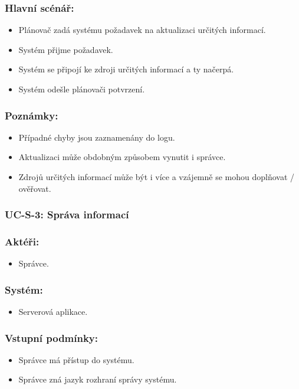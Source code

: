 \subsubsection*{Hlavní scénář:}
\begin{itemize}
 \item Plánovač zadá systému požadavek na aktualizaci určitých informací.
 \item Systém přijme požadavek.
 \item Systém se připojí ke zdroji určitých informací a ty načerpá.
 \item Systém odešle plánovači potvrzení.
\end{itemize}
\subsubsection*{Poznámky:}
\begin{itemize}
 \item Případné chyby jsou zaznamenány do logu.
 \item Aktualizaci může obdobným způsobem vynutit i správce.
 \item Zdrojů určitých informací může být i více a vzájemně se mohou doplňovat / ověřovat.
\end{itemize}

\subsubsection{UC-S-3: Správa informací}
\subsubsection*{Aktéři:}
\begin{itemize}
 \item Správce.
\end{itemize}
\subsubsection*{Systém:}
\begin{itemize}
 \item Serverová aplikace.
\end{itemize}
\subsubsection*{Vstupní podmínky:}
\begin{itemize}
 \item Správce má přístup do systému.
 \item Správce zná jazyk rozhraní správy systému.
\end{itemize}
